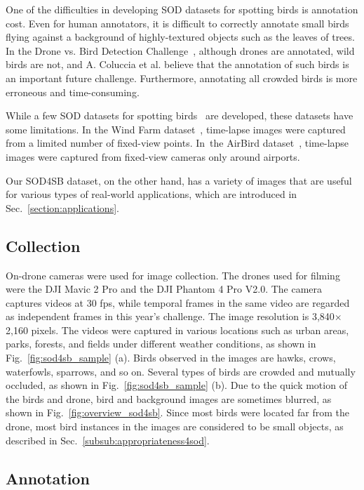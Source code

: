 \documentclass{mva_style}
\begin{document}
One of the difficulties in developing SOD datasets for spotting birds is annotation cost.
Even for human annotators, it is difficult to correctly annotate small birds flying against a background of highly-textured objects such as the leaves of trees. In the Drone vs. Bird Detection Challenge~\cite{coluccia2021drone}, although drones are annotated, wild birds are not, and A. Coluccia et al. believe that the annotation of such birds is an important future challenge.
Furthermore, annotating all crowded birds is more erroneous and time-consuming.


While a few SOD datasets for spotting birds~\cite{yoshihashi2017bird,yoshihashi2015construction,sun2022airbirds} are developed, these datasets have some limitations.
In the Wind Farm dataset~\cite{yoshihashi2017bird,yoshihashi2015construction}, time-lapse images were captured from a limited number of fixed-view points.
In~the AirBird dataset~\cite{sun2022airbirds}, time-lapse images were captured from fixed-view cameras only around airports.

Our SOD4SB dataset, on the other hand, has a variety of images that are useful for various types of real-world applications, which are introduced in Sec.~\ref{section:applications}.

\subsection{Collection} 

On-drone cameras were used for image collection. The drones used for filming were the DJI Mavic 2 Pro and the DJI Phantom 4 Pro V2.0.
The camera captures videos at 30 fps, while temporal frames in the same video are regarded as independent frames in this year's challenge.
The image resolution is 3,840$\times$2,160 pixels.
The videos were captured in various locations such as urban areas, parks, forests, and fields under different weather conditions, as shown in Fig.~\ref{fig:sod4sb_sample} (a).
Birds observed in the images are hawks, crows, waterfowls, sparrows, and so on.
Several types of birds are crowded and mutually occluded, as shown in Fig.~\ref{fig:sod4sb_sample} (b).
Due to the quick motion of the birds and drone, bird and background images are sometimes blurred, as shown in Fig.~\ref{fig:overview_sod4sb}.
Since most birds were located far from the drone, most bird instances in the images are considered to be small objects, as described in Sec.~\ref{subsub:appropriateness4sod}.

\subsection{Annotation}
\end{document}
